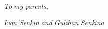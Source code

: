 
\begin{dedication} %

\textit{To my parents,}

\textit{Ivan Senkin and Gulzhan Senkina}

\end{dedication}


